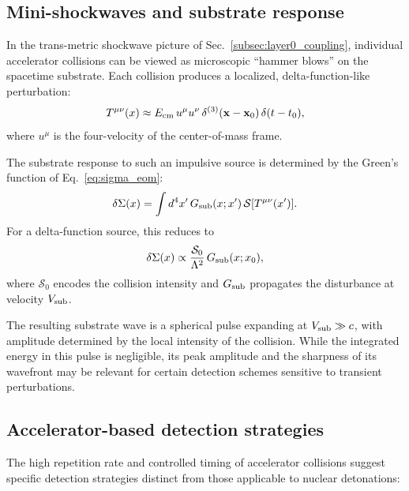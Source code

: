 \documentclass[aps,prd,twocolumn,nofootinbib,superscriptaddress]{revtex4-2}
\begin{document}
\subsection{Mini-shockwaves and substrate response}

In the trans-metric shockwave picture of Sec.~\ref{subsec:layer0_coupling}, individual accelerator collisions can be viewed as microscopic ``hammer blows'' on the spacetime substrate. Each collision produces a localized, delta-function-like perturbation:
\begin{equation}
    T^{\mu\nu}(x) \approx E_{\rm cm} \, u^\mu u^\nu \, \delta^{(3)}(\mathbf{x} - \mathbf{x}_0) \, \delta(t - t_0),
\end{equation}
where $u^\mu$ is the four-velocity of the center-of-mass frame.

The substrate response to such an impulsive source is determined by the Green's function of Eq.~\eqref{eq:sigma_eom}:
\begin{equation}
    \delta\Sigma(x) = \int d^4x' \, G_{\rm sub}(x; x') \, \mathcal{S}[T^{\mu\nu}(x')].
\end{equation}
For a delta-function source, this reduces to
\begin{equation}
    \delta\Sigma(x) \propto \frac{\mathcal{S}_0}{\Lambda^2} \, G_{\rm sub}(x; x_0),
\end{equation}
where $\mathcal{S}_0$ encodes the collision intensity and $G_{\rm sub}$ propagates the disturbance at velocity $V_{\rm sub}$.

The resulting substrate wave is a spherical pulse expanding at $V_{\rm sub} \gg c$, with amplitude determined by the local intensity of the collision. While the integrated energy in this pulse is negligible, its peak amplitude and the sharpness of its wavefront may be relevant for certain detection schemes sensitive to transient perturbations.

\subsection{Accelerator-based detection strategies}

The high repetition rate and controlled timing of accelerator collisions suggest specific detection strategies distinct from those applicable to nuclear detonations:
\end{document}
